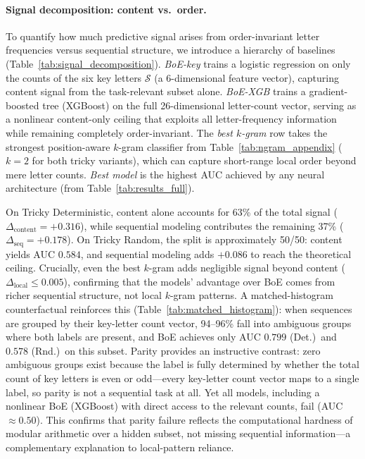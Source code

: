 \documentclass{article}
\theoremstyle{plain}
\theoremstyle{definition}
\theoremstyle{remark}
\begin{document}
\paragraph{Signal decomposition: content vs.\ order.}
To quantify how much predictive signal arises from order-invariant letter frequencies versus sequential structure, we introduce a hierarchy of baselines (Table~\ref{tab:signal_decomposition}).
\emph{BoE-key} trains a logistic regression on only the counts of the six key letters $\mathcal{S}$ (a 6-dimensional feature vector), capturing content signal from the task-relevant subset alone.
\emph{BoE-XGB} trains a gradient-boosted tree (XGBoost) on the full 26-dimensional letter-count vector, serving as a nonlinear content-only ceiling that exploits all letter-frequency information while remaining completely order-invariant.
The \emph{best $k$-gram} row takes the strongest position-aware $k$-gram classifier from Table~\ref{tab:ngram_appendix} ($k{=}2$ for both tricky variants), which can capture short-range local order beyond mere letter counts.
\emph{Best model} is the highest AUC achieved by any neural architecture (from Table~\ref{tab:results_full}).

On Tricky Deterministic, content alone accounts for 63\% of the total signal ($\Delta_{\text{content}} = +0.316$), while sequential modeling contributes the remaining 37\% ($\Delta_{\text{seq}} = +0.178$).
On Tricky Random, the split is approximately 50/50: content yields AUC $0.584$, and sequential modeling adds $+0.086$ to reach the theoretical ceiling.
Crucially, even the best $k$-gram adds negligible signal beyond content ($\Delta_{\text{local}} \leq 0.005$), confirming that the models' advantage over BoE comes from richer sequential structure, not local $k$-gram patterns.
A matched-histogram counterfactual reinforces this (Table~\ref{tab:matched_histogram}): when sequences are grouped by their key-letter count vector, 94--96\% fall into ambiguous groups where both labels are present, and BoE achieves only AUC $0.799$ (Det.)\ and $0.578$ (Rnd.)\ on this subset.
Parity provides an instructive contrast: zero ambiguous groups exist because the label is fully determined by whether the total count of key letters is even or odd---every key-letter count vector maps to a single label, so parity is not a sequential task at all. Yet all models, including a nonlinear BoE (XGBoost) with direct access to the relevant counts, fail (AUC $\approx 0.50$). This confirms that parity failure reflects the computational hardness of modular arithmetic over a hidden subset, not missing sequential information---a complementary explanation to local-pattern reliance.
\end{document}
